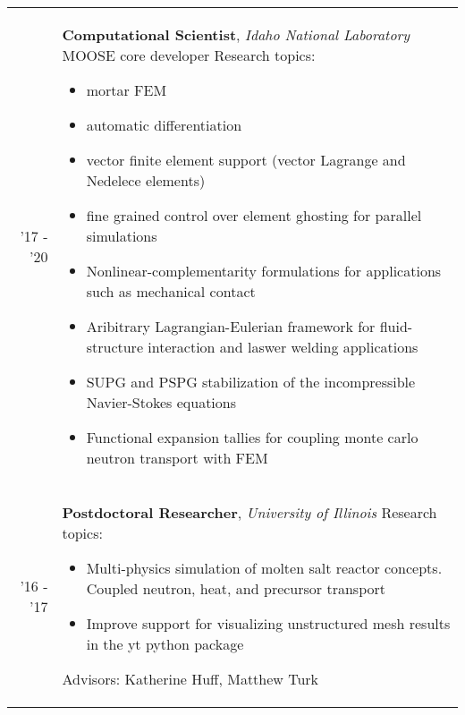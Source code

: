 \documentclass[a4paper,10pt]{article} %
\begin{document}
\begin{table}[H]
  \begin{tabularx}{\textwidth}{r>{\raggedright\arraybackslash}X}

    \textsc{'17 - '20} & \textbf{Computational Scientist}, \textit{Idaho National Laboratory}\newline
    MOOSE core developer\newline
    Research topics:
    \begin{itemize}
    \item mortar FEM
    \item automatic differentiation
    \item vector finite element support (vector Lagrange and Nedelece elements)
    \item fine grained control over element ghosting for parallel simulations
    \item Nonlinear-complementarity formulations for applications such as mechanical contact
    \item Aribitrary Lagrangian-Eulerian framework for fluid-structure interaction and laswer welding applications
    \item SUPG and PSPG stabilization of the incompressible Navier-Stokes equations
    \item Functional expansion tallies for coupling monte carlo neutron transport with FEM
    \end{itemize}\\

    \textsc{'16 - '17} & \textbf{Postdoctoral Researcher}, \textit{University of Illinois} \newline
    Research topics:
    \begin{itemize}
    \item Multi-physics simulation of molten salt reactor concepts. Coupled neutron, heat, and precursor transport
    \item Improve support for visualizing unstructured mesh results in the yt python package
    \end{itemize}
    Advisors: Katherine Huff, Matthew Turk\\

  \end{tabularx}
\end{table}

\end{document}
